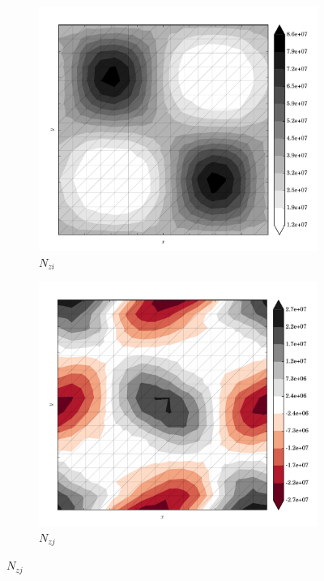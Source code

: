 \begin{figure}
  \begin{subfigure}[b]{0.3\linewidth}
    \includegraphics[width=\linewidth]{images/stress_balance/FS/N_zi.pdf}
  \caption{$N_{zi}$}
  \label{fs_N_zi}
  \end{subfigure}
  \begin{subfigure}[b]{0.3\linewidth}
    \includegraphics[width=\linewidth]{images/stress_balance/FS/N_zj.pdf}
  \caption{$N_{zj}$}
  \label{fs_N_zj}
  \end{subfigure}

\end{figure}

